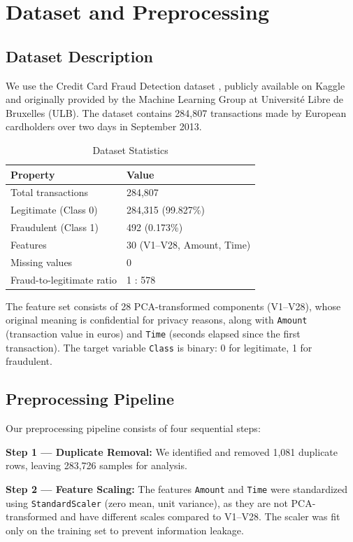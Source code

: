 \documentclass[conference]{IEEEtran}
\begin{document}
\section{Dataset and Preprocessing}
\label{sec:dataset}

\subsection{Dataset Description}

We use the Credit Card Fraud Detection dataset \cite{dataset2018}, publicly available on Kaggle and originally provided by the Machine Learning Group at Université Libre de Bruxelles (ULB). The dataset contains 284,807 transactions made by European cardholders over two days in September 2013.

\begin{table}[H]
\centering
\caption{Dataset Statistics}
\label{tab:dataset}
\begin{tabular}{ll}
\toprule
\textbf{Property} & \textbf{Value} \\
\midrule
Total transactions & 284,807 \\
Legitimate (Class 0) & 284,315 (99.827\%) \\
Fraudulent (Class 1) & 492 (0.173\%) \\
Features & 30 (V1--V28, Amount, Time) \\
Missing values & 0 \\
Fraud-to-legitimate ratio & 1 : 578 \\
\bottomrule
\end{tabular}
\end{table}

The feature set consists of 28 PCA-transformed components (V1--V28), whose original meaning is confidential for privacy reasons, along with \texttt{Amount} (transaction value in euros) and \texttt{Time} (seconds elapsed since the first transaction). The target variable \texttt{Class} is binary: 0 for legitimate, 1 for fraudulent.

\subsection{Preprocessing Pipeline}

Our preprocessing pipeline consists of four sequential steps:

\textbf{Step 1 — Duplicate Removal:} We identified and removed 1,081 duplicate rows, leaving 283,726 samples for analysis.

\textbf{Step 2 — Feature Scaling:} The features \texttt{Amount} and \texttt{Time} were standardized using \texttt{StandardScaler} (zero mean, unit variance), as they are not PCA-transformed and have different scales compared to V1--V28. The scaler was fit only on the training set to prevent information leakage.
\end{document}
